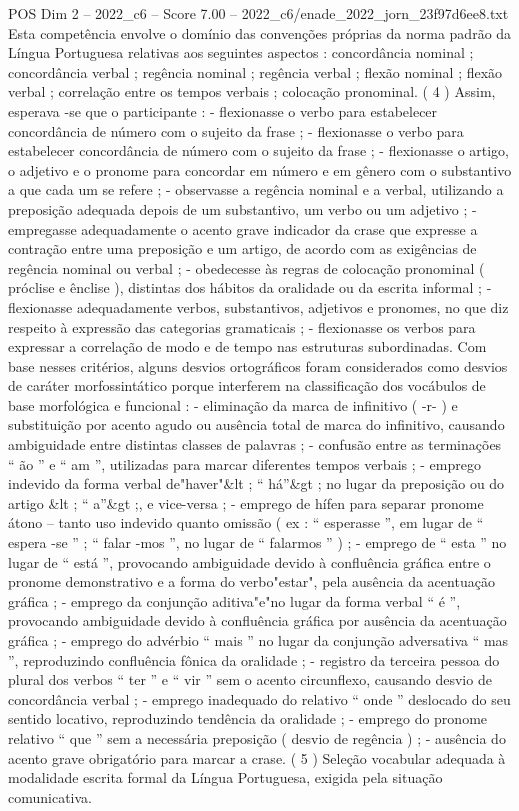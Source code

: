 \begin{textsample}{POS Dim 2 – 2022\_c6 – Score 7.00 – 2022\_c6/enade\_2022\_jorn\_23f97d6ee8.txt}
Esta competência envolve o domínio das convenções próprias da norma padrão da Língua Portuguesa relativas aos seguintes aspectos : concordância nominal ; concordância verbal ; regência nominal ; regência verbal ; flexão nominal ; flexão verbal ; correlação entre os tempos verbais ; colocação pronominal. ( 4 ) Assim, esperava -se que o participante : - flexionasse o verbo para estabelecer concordância de número com o sujeito da frase ; - flexionasse o verbo para estabelecer concordância de número com o sujeito da frase ; - flexionasse o artigo, o adjetivo e o pronome para concordar em número e em gênero com o substantivo a que cada um se refere ; - observasse a regência nominal e a verbal, utilizando a preposição adequada depois de um substantivo, um verbo ou um adjetivo ; - empregasse adequadamente o acento grave indicador da crase que expresse a contração entre uma preposição e um artigo, de acordo com as exigências de regência nominal ou verbal ; - obedecesse às regras de colocação pronominal ( próclise e ênclise ), distintas dos hábitos da oralidade ou da escrita informal ; - flexionasse adequadamente verbos, substantivos, adjetivos e pronomes, no que diz respeito à expressão das categorias gramaticais ; - flexionasse os verbos para expressar a correlação de modo e de tempo nas estruturas subordinadas.
Com base nesses critérios, alguns desvios ortográficos foram considerados como desvios de caráter morfossintático porque interferem na classificação dos vocábulos de base morfológica e funcional : - eliminação da marca de infinitivo ( -r- ) e substituição por acento agudo ou ausência total de marca do infinitivo, causando ambiguidade entre distintas classes de palavras ; - confusão entre as terminações “ ão ” e “ am ”, utilizadas para marcar diferentes tempos verbais ; - emprego indevido da forma verbal de"haver"\&lt ; “ há”\&gt ; no lugar da preposição ou do artigo \&lt ; “ a”\&gt ;, e vice-versa ; - emprego de hífen para separar pronome átono – tanto uso indevido quanto omissão ( ex : “ esperasse ”, em lugar de “ espera -se ” ; “ falar -mos ”, no lugar de “ falarmos ” ) ; - emprego de “ esta ” no lugar de “ está ”, provocando ambiguidade devido à confluência gráfica entre o pronome demonstrativo e a forma do verbo"estar", pela ausência da acentuação gráfica ; - emprego da conjunção aditiva"e"no lugar da forma verbal “ é ”, provocando ambiguidade devido à confluência gráfica por ausência da acentuação gráfica ; - emprego do advérbio “ mais ” no lugar da conjunção adversativa “ mas ”, reproduzindo confluência fônica da oralidade ; - registro da terceira pessoa do plural dos verbos “ ter ” e “ vir ” sem o acento circunflexo, causando desvio de concordância verbal ; - emprego inadequado do relativo “ onde ” deslocado do seu sentido locativo, reproduzindo tendência da oralidade ; - emprego do pronome relativo “ que ” sem a necessária preposição ( desvio de regência ) ; - ausência do acento grave obrigatório para marcar a crase. ( 5 ) Seleção vocabular adequada à modalidade escrita formal da Língua Portuguesa, exigida pela situação comunicativa.

\end{textsample}
